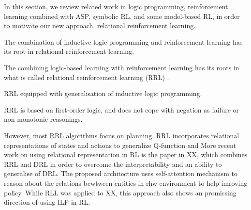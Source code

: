 In this section, we review related work in logic programming, reinforcement learning combined with ASP, symbolic RL, and some model-based RL, in order to motivate our new approach.
relational reinforcement learning.

The combination of inductive logic programming and reinforcement learning has its root in relational reinforcement learning. 

The combining logic-based learning with reinforcement learning has its roots in what is called relational reinforcement learning (RRL) \cite{Dzeroski2001}. 

RRL equipped with generalisation of inductive logic programming. 

RRL is based on first-order logic, and does not cope with negation as failure or non-monotonic reasonings.

However, most RRL algorithms focus on planning. 
RRL incorporates relational representations of states and actions to generalize Q-function and 
More recent work on using relational representation in RL is the paper in XX, which combines RRL and DRL in order to overcome the interpretability and an ability to generalise of DRL.
The proposed architecture uses self-attention mechanism to reason about the relations bewtween entities in rhw environment to help imroving policy. 
While RLL was applied to XX, this approach also shows an promissing direction of using ILP in RL.


